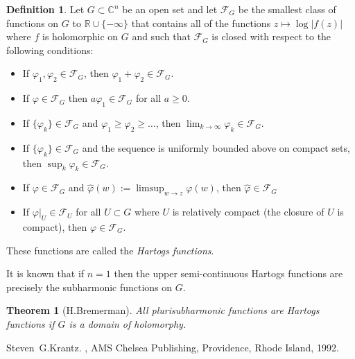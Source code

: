 \documentclass[12pt]{article}
\theoremstyle{theorem}
\newtheorem*{thm}{Theorem}
\theoremstyle{definition}
\newtheorem*{defn}{Definition}
\begin{document}
\begin{defn}
Let $G \subset {\mathbb{C}}^n$ be an open set and let ${\mathcal{F}}_G$
be the smallest class of functions on $G$ to ${\mathbb{R}} \cup \{ - \infty \}$ that contains all of the functions
$z \mapsto \log \lvert f(z) \rvert$ where $f$ is holomorphic on $G$ and such
that ${\mathcal{F}}_G$ is closed with respect to the following conditions:
\begin{itemize}
%
\item If $\varphi_1 , \varphi_2 \in {\mathcal{F}}_G$, then
$\varphi_1 + \varphi_2 \in {\mathcal{F}}_G$.
%
\item If $\varphi \in {\mathcal{F}}_G$ then
$a \varphi_1 \in {\mathcal{F}}_G$ for all $a \geq 0$.
%
\item If $\{ \varphi_k \} \in {\mathcal{F}}_G$ and
$\varphi_1 \geq \varphi_2 \geq \ldots$,
then $\lim_{k\to\infty} \varphi_k \in {\mathcal{F}}_G$.
%
\item If $\{ \varphi_k \} \in {\mathcal{F}}_G$ and
the sequence is uniformly bounded above on compact sets, then
$\sup_k \varphi_k \in {\mathcal{F}}_G$.
%
\item If $\varphi \in {\mathcal{F}}_G$ and
$\hat{\varphi}(w) := \limsup_{w \to z} \varphi(w)$,
then $\hat{\varphi} \in {\mathcal{F}}_G$
%
\item If $\varphi |_U \in {\mathcal{F}}_U$ for all
$U \subset G$ where $U$ is relatively compact (the closure
of $U$ is compact), then $\varphi \in {\mathcal{F}}_G$.
%
\end{itemize}
These functions are called the {\em Hartogs functions}.
\end{defn}

It is known that if $n=1$ then the upper semi-continuous Hartogs functions
are precisely the subharmonic functions on $G$.

\begin{thm}[H.\@ Bremerman]
All plurisubharmonic functions are Hartogs functions if
$G$ is a domain of holomorphy.
\end{thm}

\begin{thebibliography}{9}
Steven~G.\@ Krantz.
{\em {}},
AMS Chelsea Publishing, Providence, Rhode Island, 1992.
\end{thebibliography}
\end{document}
